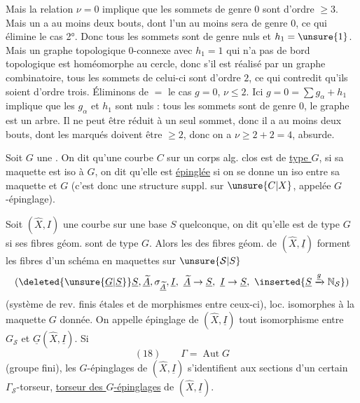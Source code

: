 Mais la relation $\nu=0$ implique que les sommets de genre $0$ sont d'ordre $\geq3$.  Mais un   a au moins deux bouts, dont l'un au moins sera de genre $0$, ce qui élimine le cas 2°. Donc tous les sommets sont de genre nuls  et $h_1=\unsure{1}$. Mais  un graphe topologique $0$-connexe avec $h_1=1$ qui n'a pas de  bord topologique est homéomorphe au cercle, donc s'il est réalisé par un graphe combinatoire, tous les sommets de celui-ci sont d'ordre $2$, ce qui contredit qu'ils soient d'ordre trois.
Éliminons de $=$ le cas $g=0$, $\nu\leq2$. Ici $g=0=\sum g_\alpha+h_1$ implique que les $g_\alpha$ et $h_1$ sont nuls : tous les sommets sont de genre $0$, le graphe est un arbre. Il ne peut être réduit à un seul sommet, donc il a au moins deux bouts, dont les  marqués doivent être $\geq2$, donc  on a $\nu\geq2+2=4$, absurde.

Soit $G$ une . On dit qu'une  courbe  $C$ sur un corps alg. clos est de \uline{type $G$}, si sa maquette est iso à $G$, on dit qu'elle est \uline{épinglée} si on se donne un iso entre sa maquette et $G$ (c'est donc une structure suppl. sur $\unsure{C|X}$, appelée $G$-épinglage).

Soit $(\widehat X,I)$ une courbe  sur une base $S$ quelconque, on dit qu'elle est de type $G$ si ses fibres géom. sont de type $G$. Alors les  des
fibres géom. de $(\widehat X,\underline I)$ forment les fibres d'un schéma en maquettes  sur $\unsure{\mathcal S|S}$
\[
(\deleted{\unsure{\underline G|\underline S}}\underline S,\underline{\widetilde A},\sigma_{\underline{\widetilde A}},\underline I,\ \underline{\widetilde A}\to\underline S,\ \underline I\to\underline S,\ \inserted{\underline S\xrightarrow{\underline g}\mathbb N_{\mathcal S}})
\]
(système de rev. finis étales  et de morphismes entre ceux-ci), loc. isomorphes à la maquette $G$ donnée.  On appelle épinglage de $(\widehat X,\underline I)$ tout isomorphisme entre $G_{\mathcal S}$ et $\underline G(\widehat X,\underline I)$. Si \deleted{$\unsure{\Gamma}$}
\[
(18)\qquad\Gamma=\operatorname{Aut}G
\]
(groupe fini), les $G$-épinglages de $(\widehat X,\underline I)$ s'identifient aux sections d'un certain $\Gamma_{\mathcal S}$-torseur,  \uline{torseur des $G$-épinglages} de $(\widehat X,\underline I)$.


